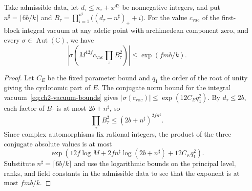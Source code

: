 \begin{lemma}
\label{lem:c-derivative-height}
\emitthmsource
Take admissible data, let $d_\tau\le\kappa_\tau+x^{42}$ be nonnegative integers, and put $n^\sharp=\lceil6b/k\rceil$ and $B_\tau=\prod_{i=1}^{n^\sharp}\bigl((d_\tau-n^\sharp)_++i\bigr)$. For the value $c_{\mathrm{vac}}$ of the first-block integral vacuum at any adelic point with archimedean component zero, and every $\sigma\in\operatorname{Aut}(\mathbb C)$, we have
\[
 \left|\sigma\left(M^{12f}c_{\mathrm{vac}}\prod_\tau B_\tau^2\right)\right|
       \le\exp(fmb/k).
\]
\end{lemma}

\begin{proof}
Let $C_E$ be the fixed parameter bound and $q_1$ the order of the root of unity giving the cyclotomic part of $E$. The conjugate norm bound for the integral vacuum~\eqref{eq:ch2-vacuum-bounds} gives $|\sigma(c_{\mathrm{vac}})|\le\exp(12C_E q_1^2)$. By $d_\tau\le2b$, each factor of $B_\tau$ is at most $2b+n^\sharp$, so
\[
 \prod_\tau B_\tau^2\le(2b+n^\sharp)^{2f n^\sharp}.
\]
Since complex automorphisms fix rational integers, the product of the three conjugate absolute values is at most
\[
 \exp\left(12f\log M+2f n^\sharp\log(2b+n^\sharp)+12 C_E q_1^2\right).
\]
Substitute $n^\sharp=\lceil6b/k\rceil$ and use the logarithmic bounds on the principal level, ranks, and field constants in the admissible data to see that the exponent is at most $fmb/k$.
\end{proof}

